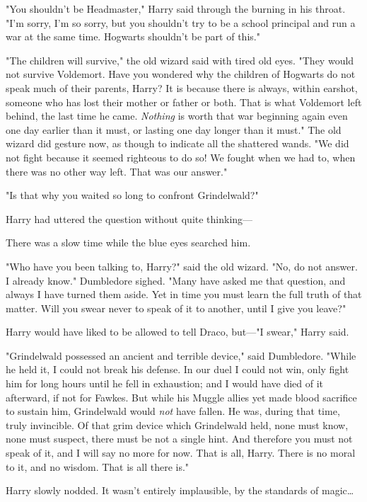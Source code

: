 "You shouldn't be Headmaster," Harry said through the burning in his throat. 
"I'm sorry, I'm so sorry, but you shouldn't try to be a school principal and 
run a war at the same time. Hogwarts shouldn't be part of this."

"The children will survive," the old wizard said with tired old eyes. "They 
would not survive Voldemort. Have you wondered why the children of Hogwarts do 
not speak much of their parents, Harry? It is because there is always, within 
earshot, someone who has lost their mother or father or both. That is what 
Voldemort left behind, the last time he came. \emph{Nothing} is worth that war 
beginning again even one day earlier than it must, or lasting one day longer 
than it must." The old wizard did gesture now, as though to indicate all the 
shattered wands. "We did not fight because it seemed righteous to do so! We 
fought when we had to, when there was no other way left. That was our answer."

"Is that why you waited so long to confront Grindelwald?"

Harry had uttered the question without quite thinking---

There was a slow time while the blue eyes searched him.

"Who have you been talking to, Harry?" said the old wizard. "No, do not answer. 
I already know." Dumbledore sighed. "Many have asked me that question, and 
always I have turned them aside. Yet in time you must learn the full truth of 
that matter. Will you swear never to speak of it to another, until I give you 
leave?"

Harry would have liked to be allowed to tell Draco, but---"I swear," Harry said.

"Grindelwald possessed an ancient and terrible device," said Dumbledore. "While 
he held it, I could not break his defense. In our duel I could not win, only 
fight him for long hours until he fell in exhaustion; and I would have died of 
it afterward, if not for Fawkes. But while his Muggle allies yet made blood 
sacrifice to sustain him, Grindelwald would \emph{not} have fallen. He was, 
during that time, truly invincible. Of that grim device which Grindelwald held, 
none must know, none must suspect, there must be not a single hint. And 
therefore you must not speak of it, and I will say no more for now. That is 
all, Harry. There is no moral to it, and no wisdom. That is all there is."

Harry slowly nodded. It wasn't entirely implausible, by the standards of 
magic{\ldots}

